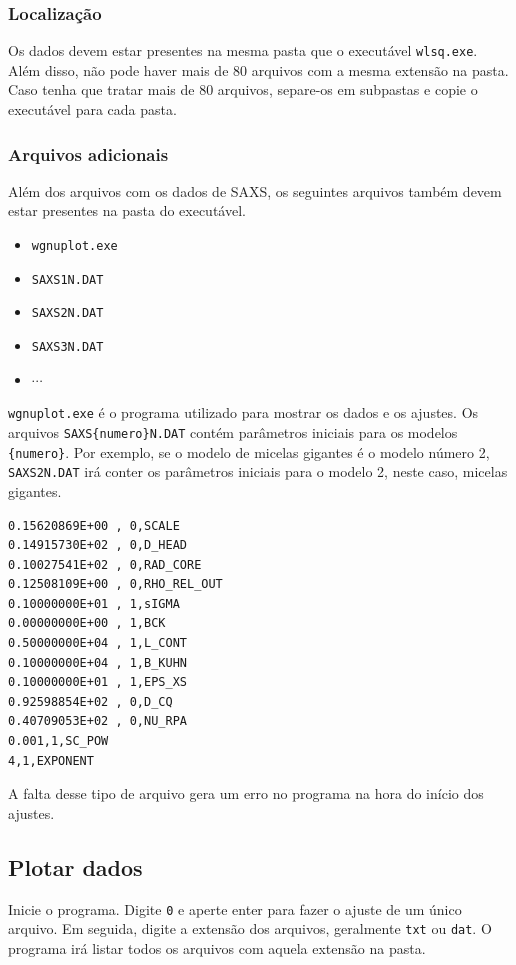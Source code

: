 \begin{apendicesenv}
\subsubsection{Localização}
Os dados devem estar presentes na mesma pasta que o executável \texttt{wlsq.exe}. Além disso, não pode haver mais de 80 arquivos com a mesma extensão na pasta. Caso tenha que tratar mais de 80 arquivos, separe-os em subpastas e copie o executável para cada pasta.

\subsubsection{Arquivos adicionais}
Além dos arquivos com os dados de SAXS, os seguintes arquivos também devem estar presentes na pasta do executável.

\begin{itemize}
	\item \texttt{wgnuplot.exe}
	\item \texttt{SAXS1N.DAT}
	\item \texttt{SAXS2N.DAT}
	\item \texttt{SAXS3N.DAT}
	\item \(\cdots\)
\end{itemize}

\texttt{wgnuplot.exe} é o programa utilizado para mostrar os dados e os ajustes. Os arquivos \texttt{SAXS\{numero\}N.DAT} contém parâmetros iniciais para os modelos \texttt{\{numero\}}. Por exemplo, se o modelo de micelas gigantes é o modelo número 2, \texttt{SAXS2N.DAT} irá conter os parâmetros iniciais para o modelo 2, neste caso, micelas gigantes.

\begin{verbatim}
0.15620869E+00 , 0,SCALE               
0.14915730E+02 , 0,D_HEAD              
0.10027541E+02 , 0,RAD_CORE            
0.12508109E+00 , 0,RHO_REL_OUT         
0.10000000E+01 , 1,sIGMA               
0.00000000E+00 , 1,BCK                 
0.50000000E+04 , 1,L_CONT              
0.10000000E+04 , 1,B_KUHN              
0.10000000E+01 , 1,EPS_XS              
0.92598854E+02 , 0,D_CQ                
0.40709053E+02 , 0,NU_RPA              
0.001,1,SC_POW
4,1,EXPONENT
\end{verbatim}

A falta desse tipo de arquivo gera um erro no programa na hora do início dos ajustes.

\subsection{Plotar dados}
Inicie o programa. Digite \texttt{0} e aperte enter para fazer o ajuste de um único arquivo. Em seguida, digite a extensão dos arquivos, geralmente \texttt{txt} ou \texttt{dat}. O programa irá listar todos os arquivos com aquela extensão na pasta.


\end{apendicesenv}
